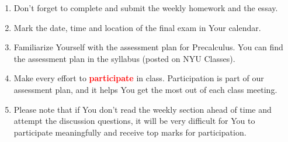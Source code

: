 \documentclass[12pt,dvipsnames]{article}
\begin{document}
\begin{mdframed}[style=exampledefault,linecolor=blue,linewidth=4pt,frametitle={Looking ahead to the last few weeks of the course...}]
	\begin{footnotesize}
	\begin{enumerate}[label= {  \arabic*:},labelindent=2em, style = standard,leftmargin=4pc, labelsep=*, noitemsep]
		\item Don't forget to complete and submit the weekly homework and the essay.
		\item Mark the date, time and location of the final exam in Your calendar.
		\item Familiarize Yourself with the assessment plan for Precalculus. You can find the assessment plan in the syllabus (posted on NYU Classes).
		\item Make every effort to {\textcolor{red}{{\bf{participate}}}} in class. Participation is part of our assessment plan, and it helps You get the most out of each class meeting. 
		\item Please note that if You don't read the weekly section ahead of time and attempt the discussion questions, it will be very difficult for You to participate meaningfully and receive top marks for participation.
		
		
	\end{enumerate}
	\end{footnotesize}
\end{mdframed}
\end{document}
